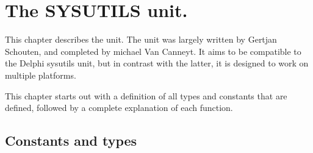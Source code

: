 %
%
%
%
%
\chapter{The SYSUTILS unit.}

This chapter describes the  unit. The  unit 
was largely written by Gertjan Schouten, and completed by michael Van Canneyt. 
It aims to be compatible to the Delphi sysutils unit, but in contrast with 
the latter, it is designed to work on multiple platforms.

This chapter starts out with a definition of all types and constants 
that are defined, followed by a complete explanation of each function.

\section{Constants and types}

